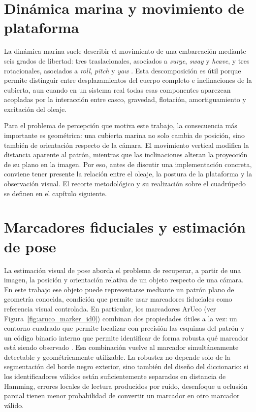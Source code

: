 \documentclass[12pt,a4paper]{report}
\begin{document}
\section{Dinámica marina y movimiento de plataforma}

La dinámica marina suele describir el movimiento de una embarcación mediante
seis grados de libertad: tres traslacionales, asociados a \emph{surge},
\emph{sway} y \emph{heave}, y tres rotacionales, asociados a \emph{roll},
\emph{pitch} y \emph{yaw} \citep{Fossen1995}. Esta descomposición es útil porque
permite distinguir entre desplazamientos del cuerpo completo e inclinaciones de
la cubierta, aun cuando en un sistema real todas esas componentes aparezcan
acopladas por la interacción entre casco, gravedad, flotación, amortiguamiento y
excitación del oleaje.

Para el problema de percepción que motiva este trabajo, la consecuencia más
importante es geométrica: una cubierta marina no solo cambia de posición, sino
también de orientación respecto de la cámara. El movimiento vertical modifica la
distancia aparente al patrón, mientras que las inclinaciones alteran la
proyección de su plano en la imagen. Por eso, antes de discutir una
implementación concreta, conviene tener presente la relación entre el oleaje, la
postura de la plataforma y la observación visual. El recorte metodológico y su
realización sobre el cuadrúpedo se definen en el capítulo siguiente.

\section{Marcadores fiduciales y estimación de pose}

La estimación visual de pose aborda el problema de recuperar, a partir de una
imagen, la posición y orientación relativa de un objeto respecto de una cámara.
En este trabajo ese objeto puede representarse mediante un patrón plano de
geometría conocida, condición que permite usar marcadores fiduciales como
referencia visual controlada. En particular, los marcadores ArUco
(ver Figura~\ref{fig:aruco_marker_id0}) combinan dos
propiedades útiles a la vez: un contorno cuadrado que permite localizar con
precisión las esquinas del patrón y un código binario interno que permite
identificar de forma robusta qué marcador está siendo observado
\citep{GarridoJurado2014}. Esa combinación
vuelve al marcador simultáneamente detectable y geométricamente utilizable. La
robustez no depende solo de la segmentación del borde negro exterior, sino
también del diseño del diccionario: si los identificadores válidos están
suficientemente separados en distancia de Hamming, errores locales de lectura
producidos por ruido, desenfoque u oclusión parcial tienen menor probabilidad
de convertir un marcador en otro marcador válido.
\end{document}
